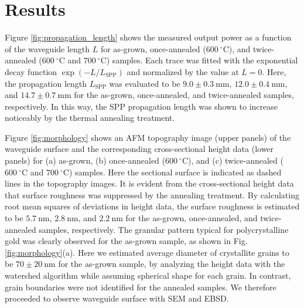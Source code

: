 \documentclass[aip,apl,reprint]{revtex4-1}
\begin{document}
\section{Results}
\label{sec:result}
Figure \ref{fig:propagation_length} shows the measured output power as a function of the waveguide length $L$ for as-grown, once-annealed ($600\:^\circ\mathrm{C}$), and twice-annealed ($600\:^\circ\mathrm{C}$ and $700\:^\circ\mathrm{C}$) samples.
Each trace was fitted with the exponential decay function $\exp(-L/L_{\mathrm{SPP}})$ and normalized by the value at $L=0$. Here, the propagation length $L_{\mathrm{SPP}}$ was evaluated to be $9.0\pm0.3\:\mathrm{mm}$, $12.0\pm0.4\:\mathrm{mm}$, and $14.7\pm0.7\:\mathrm{mm}$ for the as-grown, once-annealed, and twice-annealed samples, respectively.
In this way, the SPP propagation length was shown to increase noticeably by the thermal annealing treatment.

Figure \ref{fig:morphology} shows an AFM topography image (upper panels) of the waveguide surface and the corresponding cross-sectional height data (lower panels)  for (a) as-grown, (b) once-annealed ($600\:^\circ\mathrm{C}$), and (c) twice-annealed ($600\:^\circ\mathrm{C}$ and $700\:^\circ\mathrm{C}$) samples. Here the sectional surface is indicated as dashed lines in the topography images.
It is evident from the cross-sectional height data that surface roughness was suppressed by the annealing treatment. By calculating root mean squares of deviations in height data, the surface roughness is estimated to be $5.7\:\mathrm{nm}$, $2.8\:\mathrm{nm}$, and $2.2\:\mathrm{nm}$ for the as-grown, once-annealed, and twice-annealed samples, respectively. 
The granular pattern typical for polycrystalline gold was clearly observed for the as-grown sample, as shown in Fig. \ref{fig:morphology}(a). Here we estimated average diameter of crystallite grains to be $70\pm20\:\mathrm{nm}$ for the as-grown sample, by analyzing the height data with the watershed algorithm\cite{Petr} while assuming spherical shape for each grain. In contrast, grain boundaries were not identified for the annealed samples. We therefore proceeded to observe waveguide surface with SEM and EBSD.
\end{document}
